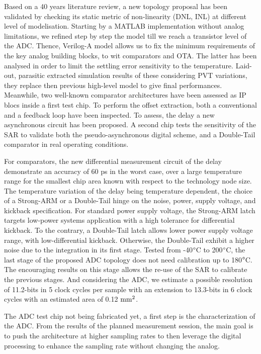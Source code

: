 \begin{mdframed}[linecolor=Prune,linewidth=1]
\begin{small}
\begin{multicols}{2}
Based on a 40 years literature review, a new topology proposal has been validated by checking its static metric of non-linearity (DNL, INL) at different level of modelisation. Starting by a MATLAB implementation without analog limitations, we refined step by step the model till we reach a transistor level of the ADC\@. Thence, Verilog-A model allows us to fix the minimum requirements of the key analog building blocks, to wit comparators and OTA\@. The latter has been analysed in order to limit the settling error sensitivity to the temperature. Laid-out, parasitic extracted simulation results of these considering PVT variations, they replace then previous high-level model to give final performances. Meanwhile, two well-known comparator architectures have been assessed as IP blocs inside a first test chip. To perform the offset extraction, both a conventional and a feedback loop have been inspected. To assess, the delay a new asynchronous circuit has been proposed. A second chip tests the sensitivity of the SAR to validate both the pseudo-asynchronous digital scheme, and a Double-Tail comparator in real operating conditions.

For comparators, the new differential measurement circuit of the delay demonstrate an accuracy of 60 ps in the worst case, over a large temperature range for the smallest chip area known with respect to the technology node size. The temperature variation of the delay being temperature dependent, the choice of a Strong-ARM or a Double-Tail hinge on the noise, power, supply voltage, and kickback specification. For standard power supply voltage, the Strong-ARM latch targets low-power systems application with a high tolerance for differential kickback. To the contrary, a Double-Tail latch allows lower power supply voltage range, with low-differential kickback. Otherwise, the Double-Tail exhibit a higher noise due to the integration in its first stage. Tested from -40$\degree$C to 200$\degree$C, the last stage of the proposed ADC topology does not need calibration up to 180$\degree$C. The encouraging results on this stage allows the re-use of the SAR to calibrate the previous stages. And considering the ADC, we estimate a possible resolution of 11.2-bits in 5 clock cycles per sample with an extension to 13.3-bits in 6 clock cycles with an estimated area of 0.12 $\rm mm^2$.

The ADC test chip not being fabricated yet, a first step is the characterization of the ADC\@. From the results of the planned measurement session, the main goal is to push the architecture at higher sampling rates to then leverage the digital processing to enhance the sampling rate without changing the analog.
\end{multicols}
\end{small}
\end{mdframed}

